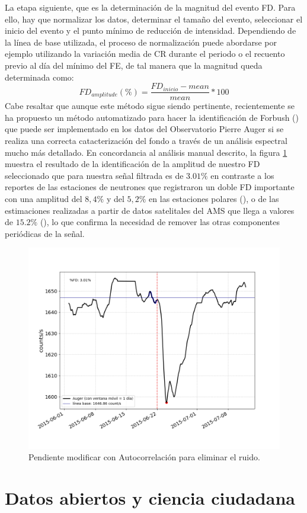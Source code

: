 La etapa siguiente, que es la determinación de la magnitud del evento FD. Para ello, hay que normalizar los datos, determinar el tamaño del evento, seleccionar el inicio del evento y el punto mínimo de reducción de intensidad. Dependiendo de la línea de base utilizada, el proceso de normalización puede abordarse por ejemplo utilizando la variación media de CR durante el periodo o el recuento previo al día del mínimo del FE, de tal manera que la magnitud queda determinada como:
\begin{equation}
    FD_{amplitude}(\%)=\frac{FD_{inicio}-mean}{mean} *100
\end{equation}
Cabe resaltar que aunque este método sigue siendo pertinente, recientemente se ha propuesto un método automatizado para hacer la identificación de Forbush (\cite{okike_2020}) que puede ser implementado en los datos del Observatorio Pierre Auger si se realiza una correcta catacterización del fondo a través de un análisis espectral mucho más detallado. En concordancia al análisis manual descrito, la figura \ref{22junio2015} muestra el resultado de la identificación de la amplitud de nuestro FD seleccionado que para nuestra señal filtrada es de $3.01\%$ en contraste a los reportes de las estaciones de neutrones que registraron un doble FD importante con una amplitud del $8,4\%$ y del $ 5,2\%$ en las estaciones polares (\cite{samara_2018}), o de las estimaciones realizadas a partir de datos satelitales del AMS que llega a valores de $15.2\%$ (\cite{wang_2023}), lo que confirma la necesidad de remover las otras componentes periódicas de la señal.
\begin{figure}
\centering
\includegraphics[width=1\linewidth]{Figs/Figr/2015-06-22 00:00:00.png}
    \caption{Pendiente modificar con Autocorrelación para eliminar el ruido.}
    \label{22junio2015}
    \end{figure}

\section{Datos abiertos y ciencia ciudadana}